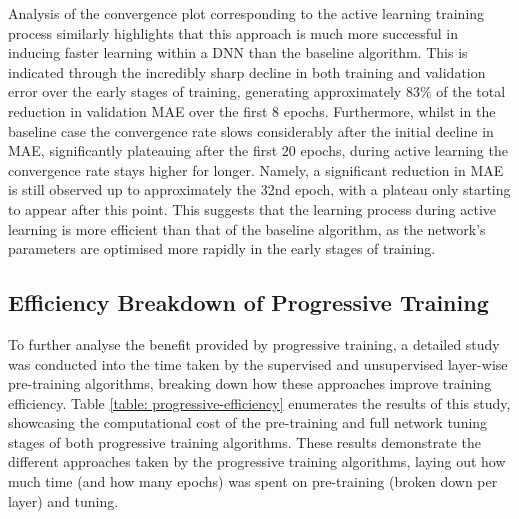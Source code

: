 \documentclass[a4paper, 11pt]{report}
\begin{document}
    Analysis of the convergence plot corresponding to the active learning training process similarly highlights that this approach is much more successful in inducing faster learning within a DNN than the baseline algorithm. This is indicated through the incredibly sharp decline in both training and validation error over the early stages of training, generating approximately $83\%$ of the total reduction in validation MAE over the first $8$ epochs. Furthermore, whilst in the baseline case the convergence rate slows considerably after the initial decline in MAE, significantly plateauing after the first $20$ epochs, during active learning the convergence rate stays higher for longer. Namely, a significant reduction in MAE is still observed up to approximately the 32nd epoch, with a plateau only starting to appear after this point. This suggests that the learning process during active learning is more efficient than that of the baseline algorithm, as the network's parameters are optimised more rapidly in the early stages of training.


    \subsection{Efficiency Breakdown of Progressive Training}

    To further analyse the benefit provided by progressive training, a detailed study was conducted into the time taken by the supervised and unsupervised layer-wise pre-training algorithms, breaking down how these approaches improve training efficiency. Table \ref{table: progressive-efficiency} enumerates the results of this study, showcasing the computational cost of the pre-training and full network tuning stages of both progressive training algorithms. These results demonstrate the different approaches taken by the progressive training algorithms, laying out how much time (and how many epochs) was spent on pre-training (broken down per layer) and tuning. 
    
\end{document}
